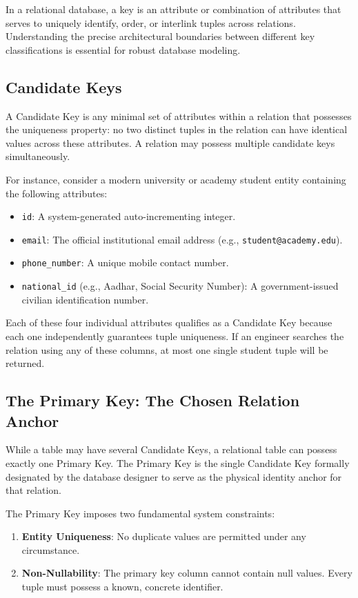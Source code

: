 \documentclass[10pt,journal,compsoc,onecolumn]{IEEEtran}
\begin{document}
In a relational database, a key is an attribute or combination of attributes that serves to uniquely identify, order, or interlink tuples across relations. Understanding the precise architectural boundaries between different key classifications is essential for robust database modeling.

\subsection{Candidate Keys}
A Candidate Key is any minimal set of attributes within a relation that possesses the uniqueness property: no two distinct tuples in the relation can have identical values across these attributes. A relation may possess multiple candidate keys simultaneously.

For instance, consider a modern university or academy student entity containing the following attributes:
\begin{itemize}
    \item \texttt{id}: A system-generated auto-incrementing integer.
    \item \texttt{email}: The official institutional email address (e.g., \texttt{student@academy.edu}).
    \item \texttt{phone\_number}: A unique mobile contact number.
    \item \texttt{national\_id} (e.g., Aadhar, Social Security Number): A government-issued civilian identification number.
\end{itemize}

Each of these four individual attributes qualifies as a Candidate Key because each one independently guarantees tuple uniqueness. If an engineer searches the relation using any of these columns, at most one single student tuple will be returned.

\subsection{The Primary Key: The Chosen Relation Anchor}
While a table may have several Candidate Keys, a relational table can possess exactly one Primary Key. The Primary Key is the single Candidate Key formally designated by the database designer to serve as the physical identity anchor for that relation. 

The Primary Key imposes two fundamental system constraints:
\begin{enumerate}
    \item \textbf{Entity Uniqueness}: No duplicate values are permitted under any circumstance.
    \item \textbf{Non-Nullability}: The primary key column cannot contain null values. Every tuple must possess a known, concrete identifier.
\end{enumerate}
\end{document}
